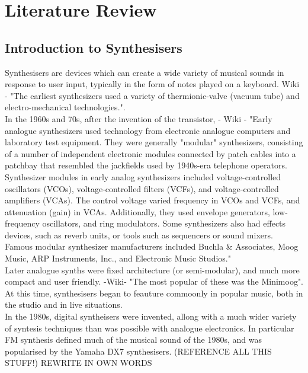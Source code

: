 \documentclass[11pt, oneside]{report}   	%
\begin{document}
\chapter{Literature Review}
\section{Introduction to Synthesisers}
Synthesisers are devices which can create a wide variety of musical sounds in response to  user input, typically in the form of notes played on a keyboard. %
Wiki - "The earliest synthesizers used a variety of thermionic-valve (vacuum tube) and electro-mechanical technologies.". \\
In the 1960s and 70s, after the invention of the transistor, - Wiki - "Early analogue synthesizers used technology from electronic analogue computers and laboratory test equipment. They were generally "modular" synthesizers, consisting of a number of independent electronic modules connected by patch cables into a patchbay that resembled the jackfields used by 1940s-era telephone operators. Synthesizer modules in early analog synthesizers included voltage-controlled oscillators (VCOs), voltage-controlled filters (VCFs), and voltage-controlled amplifiers (VCAs). The control voltage varied frequency in VCOs and VCFs, and attenuation (gain) in VCAs. Additionally, they used envelope generators, low-frequency oscillators, and ring modulators. Some synthesizers also had effects devices, such as reverb units, or tools such as sequencers or sound mixers. 
Famous modular synthesizer manufacturers included Buchla \& Associates, Moog Music, ARP Instruments, Inc., and Electronic Music Studios."\\
Later analogue synths were fixed architecture (or semi-modular), and much more compact and user friendly. -Wiki- "The most popular of these was the Minimoog". At this time, synthesisers began to feauture commoonly in popular music, both in the studio and in live situations.\\
In the 1980s, digital syntheisers were invented, allong with a much wider variety of syntesis techniques than was possible with analogue electronics. In particular FM synthesis defined much of the musical sound of the 1980s, and was popularised by the Yamaha DX7 synthesisers. (REFERENCE ALL THIS STUFF!) REWRITE IN OWN WORDS
\end{document}
